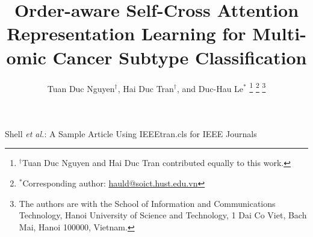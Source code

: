 \documentclass[lettersize,journal]{IEEEtran}
\begin{document}
\title{Order-aware Self-Cross Attention Representation Learning for Multi-omic Cancer Subtype Classification}



\author{Tuan Duc Nguyen$^\dagger$, 
        Hai Duc Tran$^\dagger$, 
        and Duc-Hau Le$^*$%
\thanks{$^\dagger$Tuan Duc Nguyen and Hai Duc Tran contributed equally to this work.}%
\thanks{$^*$Corresponding author: \href{mailto:hauld@soict.hust.edu.vn}{hauld@soict.hust.edu.vn}}%
\thanks{The authors are with the School of Information and Communications Technology, Hanoi University of Science and Technology, 1 Dai Co Viet, Bach Mai, Hanoi 100000, Vietnam.}}


%
{Shell \MakeLowercase{\textit{et al.}}: A Sample Article Using IEEEtran.cls for IEEE Journals}


\maketitle
\end{document}
